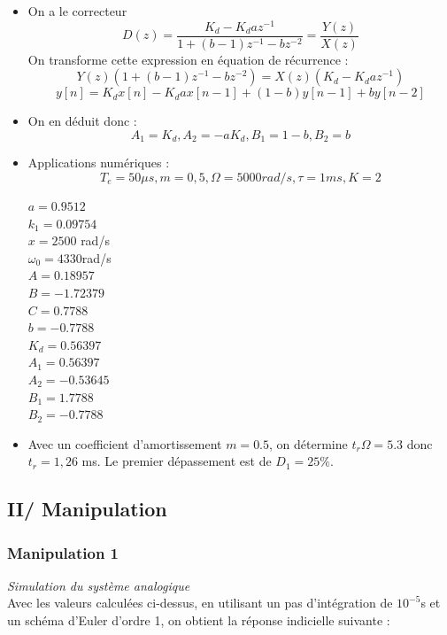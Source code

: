 \documentclass[../../Cours_M1.tex]{subfiles}
\newcommand{\z}{z^{-1}}
\begin{document}
\begin{itemize}\setlength{\itemsep}{10mm}
\item On a le correcteur 
\[ D(z) = \frac{K_d-K_da\z}{1+(b-1)\z -bz^{-2}} = \frac{Y(z)}{X(z)} \]
On transforme cette expression en équation de récurrence :
\[Y(z)(1+(b-1)\z -bz^{-2}) = X(z)(K_d-K_da\z) \]
\[ \boxed{y[n] = K_dx[n] - K_d a x[n-1] + (1-b)y[n-1] + by[n-2]}\]

\item On en déduit donc : 
\[ \boxed{ A_1 = K_d, A_2 = -aK_d, B_1 = 1-b, B_2 = b } \]

\item Applications numériques :
\[ T_e = 50 \mu s, m = 0,5, \Omega = 5000 rad/s, \tau = 1ms, K=2 \]
\begin{multicols}{3}
$a = 0.9512$\\
$k_1 = 0.09754$\\
$x = 2500 $ rad/s\\
$\omega_0 = 4330 $rad/s\\

$A = 0.18957$\\
$B = -1.72379$\\
$C = 0.7788$\\
$b = -0.7788$\\
$K_d = 0.56397$\\
$A_1 = 0.56397$\\
$A_2 = -0.53645$\\
$B_1 = 1.7788$\\
$B_2 = -0.7788$
\end{multicols}

\item Avec un coefficient d'amortissement $m=0.5$, on détermine $t_r\Omega = 5.3$ donc $t_r = 1,26$ ms. Le premier dépassement est de $D_1 = 25 \%$.
\end{itemize}

\subsection*{II/ Manipulation}

\subsubsection*{Manipulation 1}

\textit{Simulation du système analogique} \\

Avec les valeurs calculées ci-dessus, en utilisant un pas d'intégration de $10^{-5}$s et un schéma d'Euler d'ordre 1, on obtient la réponse indicielle suivante :
\end{document}
